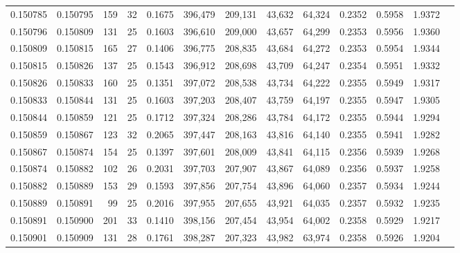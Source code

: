 \begin{tabular}{rrrrrrrrrrrrr}
0.150785 & 0.150795 & 159 &  32 &                                     0.1675 & 396,479 & 209,131 &  43,632 &  64,324 & 0.2352 & 0.5958 & 1.9372 \\
0.150796 & 0.150809 & 131 &  25 &                                     0.1603 & 396,610 & 209,000 &  43,657 &  64,299 & 0.2353 & 0.5956 & 1.9360 \\
0.150809 & 0.150815 & 165 &  27 &                                     0.1406 & 396,775 & 208,835 &  43,684 &  64,272 & 0.2353 & 0.5954 & 1.9344 \\
0.150815 & 0.150826 & 137 &  25 &                                     0.1543 & 396,912 & 208,698 &  43,709 &  64,247 & 0.2354 & 0.5951 & 1.9332 \\
0.150826 & 0.150833 & 160 &  25 &                                     0.1351 & 397,072 & 208,538 &  43,734 &  64,222 & 0.2355 & 0.5949 & 1.9317 \\
0.150833 & 0.150844 & 131 &  25 &                                     0.1603 & 397,203 & 208,407 &  43,759 &  64,197 & 0.2355 & 0.5947 & 1.9305 \\
0.150844 & 0.150859 & 121 &  25 &                                     0.1712 & 397,324 & 208,286 &  43,784 &  64,172 & 0.2355 & 0.5944 & 1.9294 \\
0.150859 & 0.150867 & 123 &  32 &                                     0.2065 & 397,447 & 208,163 &  43,816 &  64,140 & 0.2355 & 0.5941 & 1.9282 \\
0.150867 & 0.150874 & 154 &  25 &                                     0.1397 & 397,601 & 208,009 &  43,841 &  64,115 & 0.2356 & 0.5939 & 1.9268 \\
0.150874 & 0.150882 & 102 &  26 &                                     0.2031 & 397,703 & 207,907 &  43,867 &  64,089 & 0.2356 & 0.5937 & 1.9258 \\
0.150882 & 0.150889 & 153 &  29 &                                     0.1593 & 397,856 & 207,754 &  43,896 &  64,060 & 0.2357 & 0.5934 & 1.9244 \\
0.150889 & 0.150891 &  99 &  25 &                                     0.2016 & 397,955 & 207,655 &  43,921 &  64,035 & 0.2357 & 0.5932 & 1.9235 \\
0.150891 & 0.150900 & 201 &  33 &                                     0.1410 & 398,156 & 207,454 &  43,954 &  64,002 & 0.2358 & 0.5929 & 1.9217 \\
0.150901 & 0.150909 & 131 &  28 &                                     0.1761 & 398,287 & 207,323 &  43,982 &  63,974 & 0.2358 & 0.5926 & 1.9204 \\

\end{tabular}
